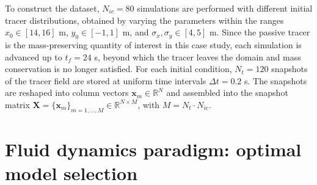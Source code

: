 \documentclass{article}
\begin{document}
To construct the dataset, $N_{ic} = 80$ simulations are performed with different initial tracer distributions, obtained by varying the parameters within the ranges \(x_0 \in [14, 16]\) m, \(y_0 \in [-1, 1]\) m, and \(\sigma_x, \sigma_y \in [4,5]\) m. Since the passive tracer is the mass-preserving quantity of interest in this case study, each simulation is advanced up to $t_f = 24$ s, beyond which the tracer leaves the domain and mass conservation is no longer satisfied.
For each initial condition, $N_t = 120$ snapshots of the tracer field are stored at uniform time intervals $\Delta t = 0.2$ s. The snapshots are reshaped into column vectors $\mathbf{x}_m \in \mathbb{R}^N$ and assembled into the snapshot matrix $\mathbf{X} = \{\mathbf{x}_m\}_{m=1,\dots,M} \in \mathbb{R}^{N \times M}$, with $M = N_t \cdot N_{ic}$.

\section{Fluid dynamics paradigm: optimal model selection}
\label{app:results_insights_fluid}
\end{document}
